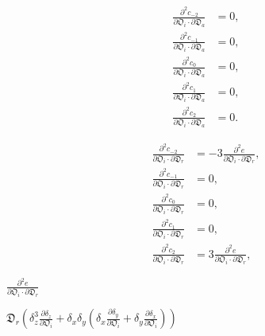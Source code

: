 \documentclass[a4paper,11pt,twoside,openright]{book}
\def\lthtmlcheckvsize{\ifdim\ht\sizebox<\vsize 
  \ifdim\wd\sizebox<\hsize\expandafter\hfill\fi \expandafter\vfill
  \else\expandafter\vss\fi}%
\begin{document}
{\newpage\clearpage
\setcounter{equation}{126}
%
\begin{subequations}\begin{align}
\frac{\partial^2 c_{-2}}{\partial \mathfrak{O}_i \cdot \partial \mathfrak{D}_a}  &=  0, \\
\frac{\partial^2 c_{-1}}{\partial \mathfrak{O}_i \cdot \partial \mathfrak{D}_a} &= 0, \\
\frac{\partial^2 c_{0}}{\partial \mathfrak{O}_i \cdot \partial \mathfrak{D}_a}  &= 0, \\
\frac{\partial^2 c_{1}}{\partial \mathfrak{O}_i \cdot \partial \mathfrak{D}_a}  &= 0, \\
\frac{\partial^2 c_{2}}{\partial \mathfrak{O}_i \cdot \partial \mathfrak{D}_a}  &= 0.
\end{align}\end{subequations}%
\lthtmldisplayZ
\lthtmlcheckvsize\clearpage}

{\newpage\clearpage
\setcounter{equation}{127}
%
\begin{subequations}\begin{align}
\frac{\partial^2 c_{-2}}{\partial \mathfrak{O}_i \cdot \partial \mathfrak{D}_r}  &=  -3 \frac{\partial^2 e}{\partial \mathfrak{O}_i \cdot \partial \mathfrak{D}_r}, \\
\frac{\partial^2 c_{-1}}{\partial \mathfrak{O}_i \cdot \partial \mathfrak{D}_r} &= 0, \\
\frac{\partial^2 c_{0}}{\partial \mathfrak{O}_i \cdot \partial \mathfrak{D}_r}  &= 0, \\
\frac{\partial^2 c_{1}}{\partial \mathfrak{O}_i \cdot \partial \mathfrak{D}_r}  &= 0, \\
\frac{\partial^2 c_{2}}{\partial \mathfrak{O}_i \cdot \partial \mathfrak{D}_r}  &= 3 \frac{\partial^2 e}{\partial \mathfrak{O}_i \cdot \partial \mathfrak{D}_r},
\end{align}\end{subequations}%
\lthtmldisplayZ
\lthtmlcheckvsize\clearpage}

{\newpage\clearpage
{}%
$\displaystyle {\frac{{\partial^2 e}}{{\partial \mathfrak{O}_i \cdot \partial \mathfrak{D}_r}}}$%
\lthtmlindisplaymathZ
\lthtmlcheckvsize\clearpage}

{\newpage\clearpage
{}%
$\displaystyle \mathfrak{D}_r \left(
\delta_z^3 \frac{\partial \delta_z}{\partial \mathfrak{O}_i}
+  \delta_x \delta_y \left( \delta_x \frac{\partial \delta_y}{\partial \mathfrak{O}_i}  +  \delta_y \frac{\partial \delta_x}{\partial \mathfrak{O}_i} \right) \right)$%
\lthtmlindisplaymathZ
\lthtmlcheckvsize\clearpage}
\end{document}
